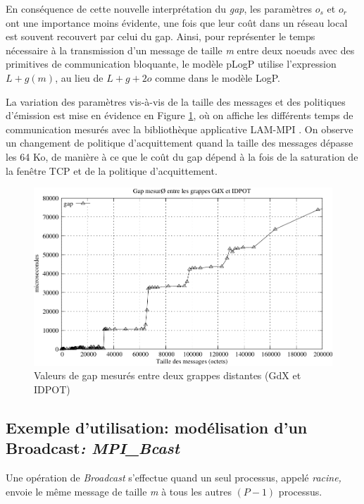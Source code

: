 En conséquence de cette nouvelle interprétation du \emph{gap}, les
paramètres $o_{s}$ et $o_{r}$ ont une importance moins évidente,
une fois que leur coût dans un réseau local est souvent recouvert
par celui du gap.  Ainsi, pour représenter le temps nécessaire à la transmission d'un
message de taille \emph{m} entre deux noeuds avec des primitives de
communication bloquante, le modèle pLogP utilise l'expression $L+g(m)$,
au lieu de $L+g+2o$ comme dans le modèle LogP. 


La variation des paramètres vis-à-vis de la taille des messages et des politiques d'émission est mise en évidence en Figure \ref{Figure: logp x hockney}, où on affiche les différents temps de communication mesurés avec la bibliothèque applicative LAM-MPI \cite{LAM04}. On observe un
changement de politique d'acquittement quand la taille des messages dépasse les 64 Ko, de manière à ce que le coût du gap dépend à la fois
de la saturation de la fenêtre TCP et de la politique d'acquittement.

%
\begin{figure}
\centering
\includegraphics[width=0.7\linewidth]{images/p2p/hockney-logp1}

\caption{\label{Figure: logp x hockney}Valeurs de gap mesurés entre deux grappes
distantes (GdX et IDPOT)}

\end{figure}

\subsection{\label{sec:Broadcast}Exemple d'utilisation: modélisation d'un Broadcast\emph{: MPI\_Bcast}}

Une opération de \emph{Broadcast} s'effectue quand un seul processus,
appelé \emph{racine,} envoie le même message de taille \emph{m} à
tous les autres $(P-1)$ processus. 


